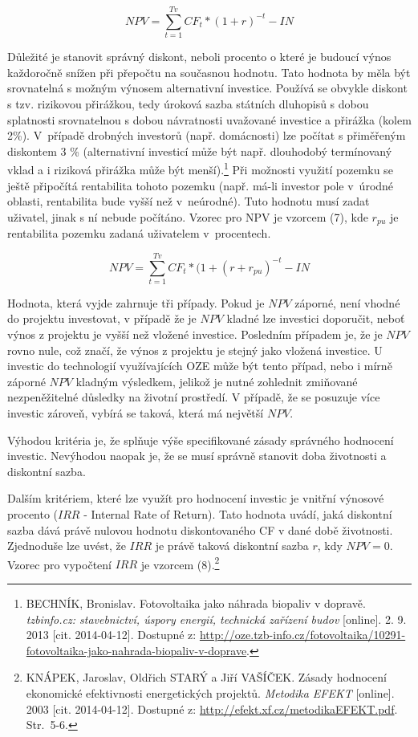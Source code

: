 \documentclass[11pt,a4paper]{article}
\begin{document}
\begin{equation}
NPV = \sum_{t=1}^{Tv} CF_{t} * (1+r)^{-t} - IN
\end{equation}

Důležité je stanovit správný diskont, neboli procento o které je budoucí výnos každoročně snížen při přepočtu na současnou hodnotu. Tato hodnota by měla být srovnatelná s možným výnosem alternativní investice. Používá se obvykle diskont s tzv. rizikovou přirážkou, tedy úroková sazba státních dluhopisů s dobou splatnosti srovnatelnou s dobou návratnosti uvažované investice a přirážka (kolem 2\%). V~případě drobných investorů (např. domácnosti) lze počítat s přiměřeným diskontem 3 \% (alternativní investicí může být např. dlouhodobý termínovaný vklad a i riziková přirážka může být menší).\footnote{BECHNÍK, Bronislav. Fotovoltaika jako náhrada biopaliv v dopravě.  \textit{tzbinfo.cz: stavebnictví, úspory energií, technická zařízení budov} [online]. 2. 9. 2013 [cit. 2014-04-12]. Dostupné z: \url{http://oze.tzb-info.cz/fotovoltaika/10291-fotovoltaika-jako-nahrada-biopaliv-v-doprave}.} Při možnosti využití pozemku se ještě připočítá rentabilita tohoto pozemku (např. má-li investor pole v~úrodné oblasti, rentabilita bude vyšší než v~neúrodné). Tuto hodnotu musí zadat uživatel, jinak s ní nebude počítáno. Vzorec pro NPV je vzorcem (7), kde $r_{pu}$ je rentabilita pozemku zadaná uživatelem v~procentech.
 
\begin{equation}
NPV = \sum_{t=1}^{Tv} CF_{t} * (1 + (r + r_{pu})^{-t} - IN
\end{equation}

Hodnota, která vyjde zahrnuje tři případy. Pokud je $NPV$ záporné, není vhodné do projektu investovat, v případě že je $NPV$ kladné lze investici doporučit, neboť výnos z projektu je vyšší než vložené investice. Posledním případem je, že je $NPV$ rovno nule, což značí, že výnos z projektu je stejný jako vložená investice. U investic do technologií využívajících OZE může být tento případ, nebo i mírně záporné $NPV$ kladným výsledkem, jelikož je nutné zohlednit zmiňované nezpeněžitelné důsledky na životní prostředí. V případě, že se posuzuje více investic zároveň, vybírá se taková, která má největší $NPV$. 

Výhodou kritéria je, že splňuje výše specifikované zásady správného hodnocení investic. Nevýhodou naopak je, že se musí správně stanovit doba životnosti a diskontní sazba. 

Dalším kritériem, které lze využít pro hodnocení investic je vnitřní výnosové procento ($IRR$ - Internal Rate of Return). Tato hodnota uvádí, jaká diskontní sazba dává právě nulovou hodnotu diskontovaného CF v dané době životnosti. Zjednoduše lze uvést, že $IRR$ je právě taková diskontní sazba $r$, kdy $NPV = 0$. Vzorec pro vypočtení $IRR$ je vzorcem (8).\footnote{KNÁPEK, Jaroslav, Oldřich STARÝ a Jiří VAŠÍČEK. Zásady hodnocení ekonomické efektivnosti energetických projektů. \textit{Metodika EFEKT} [online]. 2003 [cit. 2014-04-12]. Dostupné z: \url{http://efekt.xf.cz/metodikaEFEKT.pdf}. Str.~5-6.}
\end{document}
